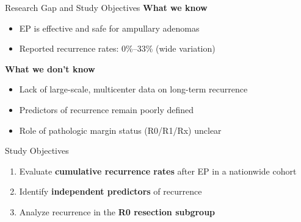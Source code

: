 \documentclass[aspectratio=169,10pt]{beamer}
\renewcommand{\neg}[1]{\textcolor{negative}{#1}}
\begin{document}
\begin{frame}{Research Gap and Study Objectives}
\textbf{What we know}
\begin{itemize}
  \item EP is effective and safe for ampullary adenomas
  \item Reported recurrence rates: 0\%--33\% (wide variation)
\end{itemize}

\vspace{4pt}
\textbf{What we don't know}
\begin{itemize}
  \item \neg{Lack of large-scale, multicenter data} on long-term recurrence
  \item Predictors of recurrence remain poorly defined
  \item Role of pathologic margin status (R0/R1/Rx) unclear
\end{itemize}

\vspace{4pt}
\begin{exampleblock}{Study Objectives}
\begin{enumerate}
  \item Evaluate \textbf{cumulative recurrence rates} after EP in a nationwide cohort
  \item Identify \textbf{independent predictors} of recurrence
  \item Analyze recurrence in the \textbf{R0 resection subgroup}
\end{enumerate}
\end{exampleblock}
\end{frame}
\end{document}
